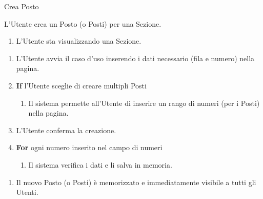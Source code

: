 {\ucTable	%
{	%
	Crea Posto
	
}{	%
	
}{	%
	L'Utente crea un Posto (o Posti) per una Sezione.
	
}{	%
	\attori
	
}{	%
	\begin{enumerate}
        \item L'Utente sta visualizzando una Sezione.
    \end{enumerate}
	
}{	%
	\begin{enumerate}
        \item L'Utente avvia il caso d'uso inserendo i dati necessario (fila e numero) nella pagina.
        \item \textbf{If} l'Utente sceglie di creare multipli Posti
            \begin{enumerate}
                \item Il sistema permette all'Utente di inserire un rango di numeri (per i Posti) nella pagina.
            \end{enumerate}
        \item L'Utente conferma la creazione.
        \item \textbf{For} ogni numero inserito nel campo di numeri %
            \begin{enumerate}
                \item Il sistema verifica i dati e li salva in memoria.
            \end{enumerate}
    \end{enumerate}
	
}{	%
	\begin{enumerate}
        \item Il nuovo Posto (o Posti) è memorizzato e immediatamente visibile a tutti gli Utenti.
    \end{enumerate}
	
}{	%
} }

